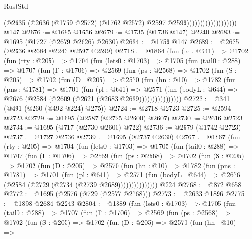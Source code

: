 \begin{lexlean}{RustStd}
\begin{coremodule}
                                      (@2635
                                        (@2636
                                          (@1759 @2572)
                                          (@1762 @2572)
                                          @2597
                                          @2599)))))))))))))))))))
    @147
@2676 := @1695 @1656
@2679 := @1735 (@1736 @147) @2240
@2683 := @1695 (@1727 (@2679 @2626) @2630)
@2684 := @1759 @147
@2689 := @2635 (@2636 @2684 @2243 @2597 @2599)
@2718 := @1864
    (fun (rc : @641) =>
    @1702
      (fun (rty : @205) =>
      @1704
        (fun (lets0 : @1703) =>
        @1705
          (fun (tail0 : @288) =>
          @1707
            (fun (Γ : @1706) =>
            @2569
              (fun (ps : @2568) =>
              @1702
                (fun (S : @205) =>
                @1702
                  (fun (D : @205) =>
                  @2570
                    (fun (hn : @10) =>
                    @1782
                      (fun (pns : @1781) =>
                      @1701
                        (fun (pl : @641) =>
                        @2571
                          (fun (bodyL : @644) =>
                          @2676 (@2584 (@2609 (@2621 (@2683 @2689))))))))))))))))
@2723 := @341 (@491 (@260 (@492 @224) @275))
@2724 := @2718 @2723
@2725 := @2594 @2723
@2729 := @1695 (@2587 (@2725 @2600) @2607)
@2730 := @2616 @2723
@2734 := @1695 (@717 (@2730 @2600) @722)
@2736 := @2679 (@1742 @2723)
@2737 := @1727 @2736
@2739 := @1695 (@2737 @2630)
@2767 := @1867
    (fun (rty : @205) =>
    @1704
      (fun (lets0 : @1703) =>
      @1705
        (fun (tail0 : @288) =>
        @1707
          (fun (Γ : @1706) =>
          @2569
            (fun (ps : @2568) =>
            @1702
              (fun (S : @205) =>
              @1702
                (fun (D : @205) =>
                @2570
                  (fun (hn : @10) =>
                  @1782
                    (fun (pns : @1781) =>
                    @1701
                      (fun (pl : @641) =>
                      @2571
                        (fun (bodyL : @644) =>
                        @2676 (@2584 (@2729 (@2734 (@2739 @2689)))))))))))))))
    @224
@2768 := @872 @658
@2772 := @1695 (@2576 (@729 (@2577 @2768)))
@2773 := @2633 @1896
@2775 := @1898 @2684 @2243
@2804 := @1889
    (fun (lets0 : @1703) =>
    @1705
      (fun (tail0 : @288) =>
      @1707
        (fun (Γ : @1706) =>
        @2569
          (fun (ps : @2568) =>
          @1702
            (fun (S : @205) =>
            @1702
              (fun (D : @205) =>
              @2570
                (fun (hn : @10) =>

\end{coremodule}
\end{lexlean}
